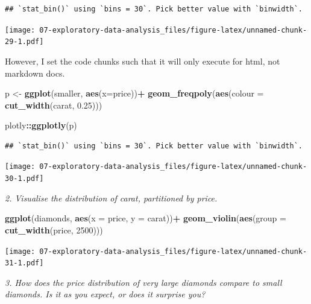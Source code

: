 \documentclass[]{book}
\newenvironment{Shaded}{\begin{snugshade}}{\end{snugshade}}
\newcommand{\DataTypeTok}[1]{\textcolor[rgb]{0.13,0.29,0.53}{#1}}
\newcommand{\DecValTok}[1]{\textcolor[rgb]{0.00,0.00,0.81}{#1}}
\newcommand{\FloatTok}[1]{\textcolor[rgb]{0.00,0.00,0.81}{#1}}
\newcommand{\KeywordTok}[1]{\textcolor[rgb]{0.13,0.29,0.53}{\textbf{#1}}}
\newcommand{\NormalTok}[1]{#1}
\newcommand{\OperatorTok}[1]{\textcolor[rgb]{0.81,0.36,0.00}{\textbf{#1}}}
\newcommand{\StringTok}[1]{\textcolor[rgb]{0.31,0.60,0.02}{#1}}
\theoremstyle{definition}
\theoremstyle{definition}
\theoremstyle{definition}
\theoremstyle{remark}
\begin{document}
\begin{verbatim}
## `stat_bin()` using `bins = 30`. Pick better value with `binwidth`.
\end{verbatim}

\texttt{[image: 07-exploratory-data-analysis\_files/figure-latex/unnamed-chunk-29-1.pdf]}

However, I set the code chunks such that it will only execute for html,
not markdown docs.

\begin{Shaded}
\begin{Highlighting}[]
\NormalTok{p <-}\StringTok{ }\KeywordTok{ggplot}\NormalTok{(smaller, }\KeywordTok{aes}\NormalTok{(}\DataTypeTok{x=}\NormalTok{price))}\OperatorTok{+}
\StringTok{  }\KeywordTok{geom_freqpoly}\NormalTok{(}\KeywordTok{aes}\NormalTok{(}\DataTypeTok{colour =} \KeywordTok{cut_width}\NormalTok{(carat, }\FloatTok{0.25}\NormalTok{)))}


\NormalTok{plotly}\OperatorTok{::}\KeywordTok{ggplotly}\NormalTok{(p)}
\end{Highlighting}
\end{Shaded}

\begin{verbatim}
## `stat_bin()` using `bins = 30`. Pick better value with `binwidth`.
\end{verbatim}

\texttt{[image: 07-exploratory-data-analysis\_files/figure-latex/unnamed-chunk-30-1.pdf]}

\emph{2. Visualise the distribution of carat, partitioned by price.}

\begin{Shaded}
\begin{Highlighting}[]
\KeywordTok{ggplot}\NormalTok{(diamonds, }\KeywordTok{aes}\NormalTok{(}\DataTypeTok{x =}\NormalTok{ price, }\DataTypeTok{y =}\NormalTok{ carat))}\OperatorTok{+}
\StringTok{  }\KeywordTok{geom_violin}\NormalTok{(}\KeywordTok{aes}\NormalTok{(}\DataTypeTok{group =} \KeywordTok{cut_width}\NormalTok{(price, }\DecValTok{2500}\NormalTok{)))}
\end{Highlighting}
\end{Shaded}

\texttt{[image: 07-exploratory-data-analysis\_files/figure-latex/unnamed-chunk-31-1.pdf]}

\emph{3. How does the price distribution of very large diamonds compare
to small diamonds. Is it as you expect, or does it surprise you?}
\end{document}
